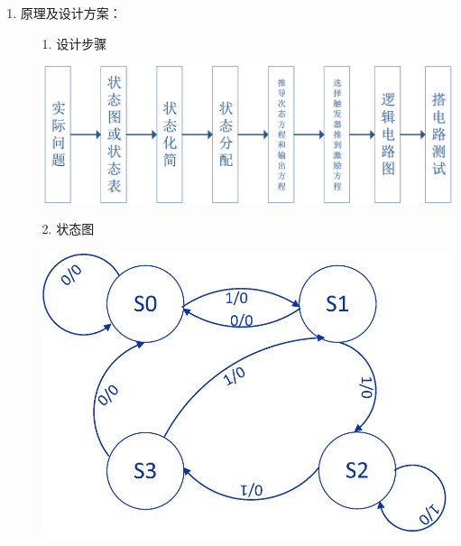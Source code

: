 \documentclass[UTF8]{ctexart}
\begin{document}
\begin{enumerate}
    \large
    \vspace{1\baselineskip}
    \item 原理及设计方案：  \\
          \begin{itemize}
              \item [1.] 设计步骤 \\
                    \begin{center}
                        \includegraphics[scale=0.6]{1.png}
                        \label{fig:label}
                    \end{center}

              \item [2.] 状态图 \\
                    \begin{center}
                        \includegraphics[scale = 0.6]{2.png}
                        \label{fig:label}
                    \end{center}


\end{itemize}
\end{enumerate}
\end{document}
